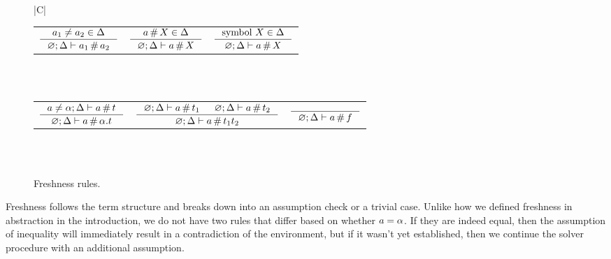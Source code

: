 \documentclass[english, mgr]{iithesis}
\newcommand{\solverRule}{\vdash}
\begin{document}
\begin{figure}[htbp]
    \centering
    \begin{tabularx}{\textwidth}{|C|}
      \hline \\
      \begin{tabular}{ccc}
      $
      \inference{
        \atomv_1 \cneq \atomv_2 \in \icEnv
      }{
        \emptyenv ; \icEnv \solverRule \atomv_1 \cfresh \atomv_2
      }
      $ & $
      \inference{
        \atomv \cfresh \termv \in \icEnv
      }{
        \emptyenv ; \icEnv \solverRule \atomv \cfresh \termv
      }
      $ & $
      \inference{
        \csymb \termv \in \icEnv
      }{
        \emptyenv ; \icEnv \solverRule \atomv \cfresh \termv
      }
      $
      \end{tabular}
      \\ \\
      \begin{tabular}{ccc}
      $
      \inference{
        \atomv \cneq \atomexp ; \icEnv \solverRule \atomv \cfresh \term
      }{
        \emptyenv ; \icEnv \solverRule \atomv \cfresh \tbind{\atomexp}{\term}
      }
      $ &
      $
      \inference{
        \emptyenv ; \icEnv \solverRule \atomv \cfresh \term_1
        &
        \emptyenv ; \icEnv \solverRule \atomv \cfresh \term_2
      }{
        \emptyenv ; \icEnv \solverRule \atomv \cfresh \term_1 \term_2
      }
      $ & $
      \inference{
      }{
        \emptyenv ; \icEnv \solverRule \atomv \cfresh \symb
      }
      $
      \end{tabular}
      \\ \\ \hline
      \end{tabularx}
  \caption{Freshness rules.}
  \label{fig:freshness-rules}
\end{figure}
Freshness follows the term structure and breaks down into an assumption check or a trivial case.
Unlike how we defined freshness in abstraction in the introduction,
we do not have two rules that differ based on whether $a = \alpha$.
If they are indeed equal, then the assumption of inequality will immediately
result in a contradiction of the environment, but if it wasn't yet established,
then we continue the solver procedure with an additional assumption.
\end{document}
